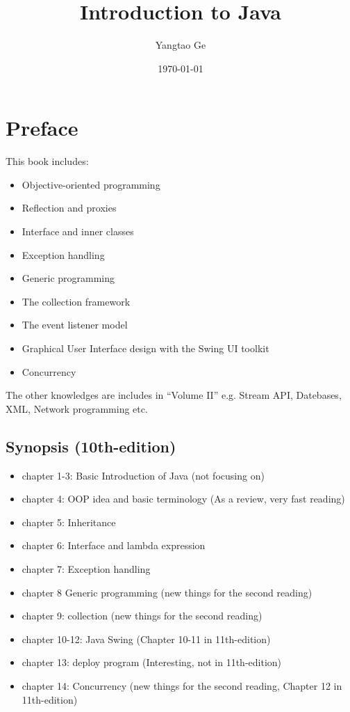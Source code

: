 \documentclass[12pt]{article}
\title{Introduction to Java}
\author{Yangtao Ge}
\date{\today}
\begin{document}
\maketitle
\section{Preface}
This book includes:
\begin{itemize}
    \item Objective-oriented programming
    \item Reflection and proxies
    \item Interface and inner classes
    \item Exception handling
    \item Generic programming
    \item The collection framework
    \item The event listener model
    \item Graphical User Interface design with the Swing UI toolkit
    \item Concurrency
\end{itemize}
The other knowledges are includes in ``Volume II'' e.g. Stream API, Datebases, XML, Network programming etc.

\subsection*{Synopsis (10th-edition)}
\begin{itemize}
    \item chapter 1-3: Basic Introduction of Java (not focusing on)
    \item chapter 4: OOP idea and basic terminology (As a review, very fast reading)
    \item chapter 5: Inheritance
    \item chapter 6: Interface and lambda expression
    \item chapter 7: Exception handling
    \item chapter 8 Generic programming (new things for the second reading)
    \item chapter 9: collection (new things for the second reading)
    \item chapter 10-12: Java Swing (Chapter 10-11 in 11th-edition)
    \item chapter 13: deploy program (Interesting, not in 11th-edition) 
    \item chapter 14: Concurrency (new things for the second reading, Chapter 12 in 11th-edition)
\end{itemize}
\end{document}
